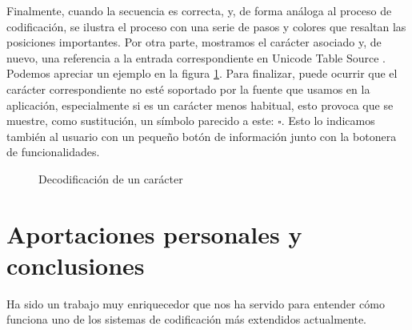 \documentclass{article}
\begin{document}
Finalmente, cuando la secuencia es correcta, y, de forma análoga al proceso de
codificación, se ilustra el proceso con una serie de pasos y colores que resaltan
las posiciones importantes. Por otra parte, mostramos el carácter asociado y, de
nuevo, una referencia a la entrada correspondiente en Unicode Table Source
\cite{unicode-table-source}. Podemos apreciar un ejemplo en la figura
\ref{fig:decodificacion-ejemplo-ok}. Para finalizar, puede ocurrir que el
carácter correspondiente no esté soportado por la fuente que usamos en la
aplicación, especialmente si es un carácter menos habitual, esto provoca que se
muestre, como sustitución, un símbolo parecido a este: $\square$. Esto lo indicamos
también al usuario con un pequeño botón de información junto con la botonera de
funcionalidades.

\begin{figure}[h!]
  \centering
  \caption{Decodificación de un carácter}
  \label{fig:decodificacion-ejemplo-ok}
\end{figure}

\newpage
\section{Aportaciones personales y conclusiones}

Ha sido un trabajo muy enriquecedor que nos ha servido para entender cómo funciona uno de los sistemas de codificación más extendidos actualmente.
\end{document}
